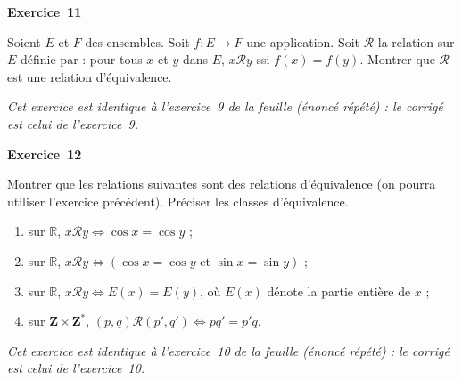 \documentclass[11pt,a4paper]{article}
\newcommand{\meme}[1]{\emph{Cet exercice est identique à l'exercice~#1 de la feuille (énoncé répété) : le corrigé est celui de l'exercice~#1.}}
\begin{document}
	\medskip\noindent\textbf{\Large\color{bleu}Exercice~11}\nopagebreak
	\begin{enonce}
		Soient $E$ et $F$ des ensembles. Soit $f : E \to F$ une application. Soit $\mathcal{R}$ la relation sur $E$ définie par : pour tous $x$ et $y$ dans $E$, $x\mathcal{R}y$ ssi $f(x)=f(y)$. Montrer que $\mathcal{R}$ est une relation d'équivalence.
	\end{enonce}
	\begin{corrige}
		\meme{9}
	\end{corrige}
	
	\medskip\noindent\textbf{\Large\color{bleu}Exercice~12}\nopagebreak
	\begin{enonce}
		Montrer que les relations suivantes sont des relations d'équivalence (on pourra utiliser l'exercice précédent). Préciser les classes d'équivalence.
		\begin{enumerate}
			\item[a)] sur $\mathbb{R}$, $x\mathcal{R}y \iff \cos x = \cos y$ ;
			\item[b)] sur $\mathbb{R}$, $x\mathcal{R}y \iff (\cos x = \cos y \text{ et } \sin x = \sin y)$ ;
			\item[c)] sur $\mathbb{R}$, $x\mathcal{R}y \iff E(x) = E(y)$, où $E(x)$ dénote la partie entière de $x$ ;
			\item[d)] sur $\mathbf{Z} \times \mathbf{Z}^*$, $(p,q)\mathcal{R}(p',q') \iff pq' = p'q$.
		\end{enumerate}
	\end{enonce}
	\begin{corrige}
		\meme{10}
	\end{corrige}
	
\end{document}

